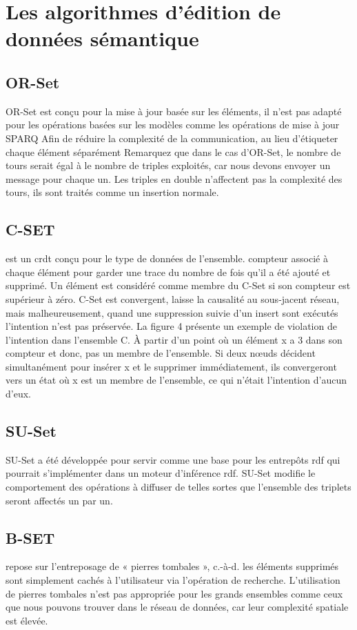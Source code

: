 \documentclass[12pt]{report}
\begin{document}
\section{Les algorithmes d'édition de données sémantique}
\subsection{OR-Set}
OR-Set est conçu pour la mise à jour basée sur les éléments, il n’est pas adapté pour les opérations basées sur les modèles comme les opérations de mise à jour SPARQ  Afin de réduire la complexité de la communication, au lieu d’étiqueter chaque élément séparément Remarquez que dans le cas d’OR-Set, le nombre de tours serait égal à le nombre de triples exploités, car nous devons envoyer un message pour chaque un. Les triples en double n’affectent pas la complexité des tours, ils sont traités comme un insertion normale.
\subsection{C-SET \cite{C-SET}}
est un \acs{crdt} conçu pour le type de données de l’ensemble.
compteur associé à chaque élément pour garder une trace du nombre de fois qu’il a été ajouté et supprimé. Un élément est considéré comme membre du C-Set si son compteur
est supérieur à zéro. C-Set est convergent, laisse la causalité au sous-jacent réseau, mais malheureusement, quand une suppression suivie d’un insert sont exécutés
l’intention n’est pas préservée. La figure 4 présente un exemple de violation de l’intention dans l’ensemble C. À partir d’un point où un élément x a 3 dans son compteur et donc, pas un membre de l’ensemble. Si deux nœuds décident simultanément pour insérer x et le supprimer immédiatement, ils convergeront vers un état où x est un membre de l’ensemble, ce qui n’était l’intention d’aucun d’eux.
\subsection{SU-Set}
SU-Set a été développée pour servir comme une base pour les entrepôts \acs{rdf} qui 
pourrait s’implémenter dans un moteur d’inférence \acs{rdf}. SU-Set modifie le comportement des 
opérations à diffuser de telles sortes que l’ensemble des triplets seront affectés un par un.
\subsection{B-SET \cite{B-SET}} repose sur l’entreposage de « pierres tombales », c.-à-d. les éléments supprimés sont simplement cachés à l’utilisateur via l’opération de recherche. L’utilisation de pierres tombales n’est pas appropriée pour les grands ensembles comme ceux que nous pouvons trouver dans le réseau de données, car leur complexité spatiale est élevée.
\end{document}
